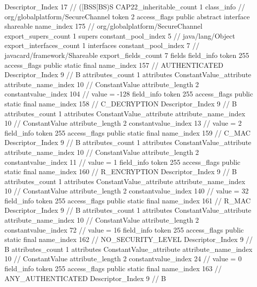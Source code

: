 {{{{{					Descriptor_Index	17		// ([BSS[BS)S
				}
			}
			CAP22_inheritable_count	1
		}
		class_info {		// org/globalplatform/SecureChannel
			token	2
			access_flags	public abstract interface shareable
			name_index	175		// org/globalplatform/SecureChannel
			export_supers_count	1
			supers {
				constant_pool_index	5		// java/lang/Object
			}
			export_interfaces_count	1
			interfaces {
				constant_pool_index	7		// javacard/framework/Shareable
			}
			export_fields_count	7
			fields {
			field_info {
				token	255
				access_flags	public static final
				name_index	157		// AUTHENTICATED
				Descriptor_Index	9		// B
				attributes_count	1
				attributes {
				ConstantValue_attribute {
					attribute_name_index	10		// ConstantValue
					attribute_length	2
					constantvalue_index	104		// value = -128
				}
				}
			}
			field_info {
				token	255
				access_flags	public static final
				name_index	158		// C_DECRYPTION
				Descriptor_Index	9		// B
				attributes_count	1
				attributes {
				ConstantValue_attribute {
					attribute_name_index	10		// ConstantValue
					attribute_length	2
					constantvalue_index	13		// value = 2
				}
				}
			}
			field_info {
				token	255
				access_flags	public static final
				name_index	159		// C_MAC
				Descriptor_Index	9		// B
				attributes_count	1
				attributes {
				ConstantValue_attribute {
					attribute_name_index	10		// ConstantValue
					attribute_length	2
					constantvalue_index	11		// value = 1
				}
				}
			}
			field_info {
				token	255
				access_flags	public static final
				name_index	160		// R_ENCRYPTION
				Descriptor_Index	9		// B
				attributes_count	1
				attributes {
				ConstantValue_attribute {
					attribute_name_index	10		// ConstantValue
					attribute_length	2
					constantvalue_index	140		// value = 32
				}
				}
			}
			field_info {
				token	255
				access_flags	public static final
				name_index	161		// R_MAC
				Descriptor_Index	9		// B
				attributes_count	1
				attributes {
				ConstantValue_attribute {
					attribute_name_index	10		// ConstantValue
					attribute_length	2
					constantvalue_index	72		// value = 16
				}
				}
			}
			field_info {
				token	255
				access_flags	public static final
				name_index	162		// NO_SECURITY_LEVEL
				Descriptor_Index	9		// B
				attributes_count	1
				attributes {
				ConstantValue_attribute {
					attribute_name_index	10		// ConstantValue
					attribute_length	2
					constantvalue_index	24		// value = 0
				}
				}
			}
			field_info {
				token	255
				access_flags	public static final
				name_index	163		// ANY_AUTHENTICATED
				Descriptor_Index	9		// B
}}}}}

